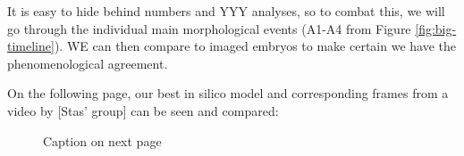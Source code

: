 
It is easy to hide behind numbers and YYY analyses, so to combat this, we will go through the individual main morphological events (A1-A4 from Figure \ref{fig:big-timeline}). WE can then compare to imaged embryos to make certain we have the phenomenological agreement.

On the following page, our best in silico model and corresponding frames from a video by [Stas' group] can be seen and compared:

\newpage

\begin{figure}[H]
    \centering
    \vspace*{-1cm}\hspace*{-1cm}
    \caption{Caption on next page}
    \label{fig:big-visual-comparison}
\end{figure}
